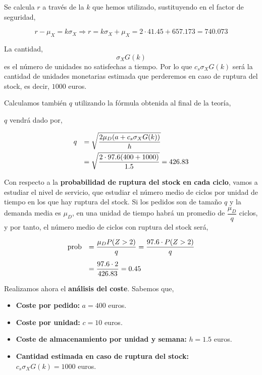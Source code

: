 \documentclass[a4paper,12pt]{article}
\begin{document}
Se calcula \textbf{$r$} a trav\'es de la $k$ que hemos utilizado, sustituyendo en el factor de seguridad,

$$ r - \mu_X = k\sigma_X \Rightarrow r = k\sigma_X + \mu_X = 2\cdot 41.45 + 657.173 = 740.073$$

La cantidad, $$ \sigma_X G(k)$$ es el n\'umero de unidades no satisfechas a tiempo. Por lo que $c_s\sigma_X G(k)$ ser\'a la cantidad de unidades monetarias estimada que perderemos en caso de ruptura del stock, es decir, $1000$ euros.

Calculamos tambi\'en $q$ utilizando la f\'ormula obtenida al final de la teor\'ia,

$q$ vendr\'a dado por,

\begin{equation*}
\begin{array}{l l}
q & =  \sqrt{\dfrac{2\mu_D (a + c_s \sigma_X G(k))}{h}} \\[.3cm]
\, & = \sqrt{\dfrac{2\cdot 97.6(400 + 1000)}{1.5}} = 426.83
\end{array}
\end{equation*}

Con respecto a la \textbf{probabilidad de ruptura del stock en cada ciclo}, vamos a estudiar el nivel de servicio, que estudiar el n\'umero medio de ciclos por unidad de tiempo en los que hay ruptura del stock. Si los pedidos son de tama\~no $q$ y la demanda media es $\mu_D$, en una unidad de tiempo habr\'a un promedio de $\dfrac{\mu_D}{q}$ ciclos, y por tanto, el n\'umero medio de ciclos con ruptura del stock ser\'a,

\begin{equation*}
\begin{array}{l l}
\text{prob} & = \dfrac{\mu_D P(Z > 2)}{q} = \dfrac{97.6\cdot P(Z > 2)}{q}\\[.5cm]
\, & = \dfrac{97.6\cdot 2}{426.83} = 0.45
\end{array}
\end{equation*}

Realizamos ahora el \textbf{an\'alisis del coste}. Sabemos que,

\begin{itemize}
\item[] \textbf{Coste por pedido:} $a = 400$ euros.
\item[] \textbf{Coste por unidad:} $c = 10$ euros.
\item[] \textbf{Coste de almacenamiento por unidad y semana:} $h = 1.5$ euros.

\item[] \textbf{Cantidad estimada en caso de ruptura del stock:} \\$c_s \sigma_X G(k) = 1000$ euros.
\end{itemize}
\end{document}
